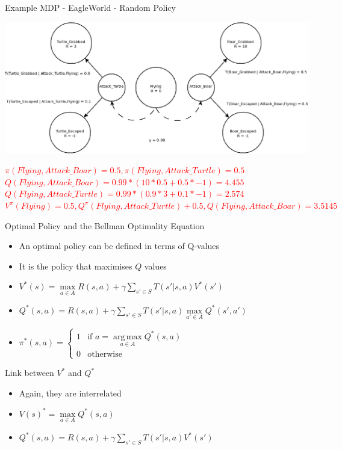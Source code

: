 \documentclass[]{beamer}
\providecommand{\tightlist}{%
  \setlength{\itemsep}{0pt}\setlength{\parskip}{0pt}}
\newcommand{\twopartdefo}[3]
{
  \left\{
    \begin{array}{ll}
      #1 & \mbox{if } #2 \\
      #3 & \mbox{otherwise}
    \end{array}
  \right.
}
\DeclareMathOperator*{\argmax}{arg\,max}
\begin{document}
\begin{frame}{Example MDP - EagleWorld - Random Policy}

\includegraphics[scale=0.33]{figures/MDPExample-simple2.png}

\small
\center
\textcolor{red}{
$\pi(Flying, Attack\_Boar) = 0.5, \pi(Flying,Attack\_Turtle) = 0.5$
$Q(Flying, Attack\_Boar)   = 0.99 * (10 * 0.5 + 0.5*-1) = 4.455$
$Q(Flying, Attack\_Turtle) = 0.99 * (0.9 * 3 + 0.1*-1) = 2.574$
$V^\pi(Flying) = 0.5, Q^\pi(Flying, Attack\_Turtle) +0.5, Q(Flying, Attack\_Boar) = 3.5145$
}

\end{frame}

\begin{frame}{Optimal Policy and the Bellman Optimality Equation}

\begin{itemize}
\tightlist
\item
  An optimal policy can be defined in terms of Q-values
\item
  It is the policy that maximises \(Q\) values
\item
  \(V^* (s) = \max\limits_{a \in A}R(s,a) + \gamma\sum\limits_{s' \in S}T(s'|s,a) V^*(s')\)
\item
  \(Q^* (s,a) = R(s,a) + \gamma\sum\limits_{s' \in S} T(s'|s,a) \max\limits_{a' \in A} Q^*(s',a')\)
\item
  \(\pi^*(s,a) = \twopartdefo{ 1 } {a = \argmax\limits_{a \in A} Q^*(s,a)} {0}\)
\end{itemize}

\end{frame}

\begin{frame}{Link between \(V^*\) and \(Q^*\)}

\begin{itemize}
\tightlist
\item
  Again, they are interrelated
\item
  \(V(s)^* = \max\limits_{a \in A} Q^*(s,a)\)
\item
  \(Q^*(s,a) = R(s,a) + \gamma\sum\limits_{s' \in S} T(s'|s,a) V^*(s')\)
\end{itemize}

\end{frame}
\end{document}
